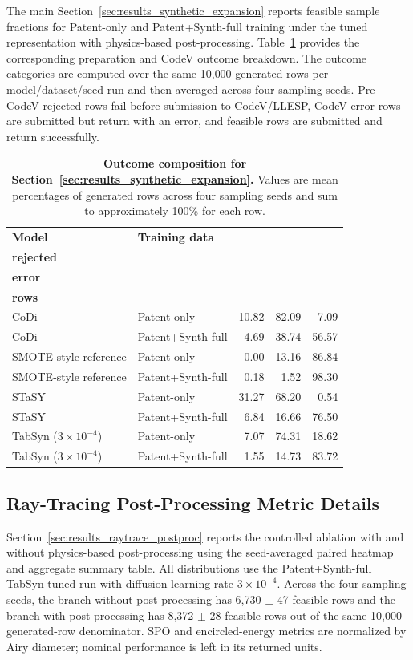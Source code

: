 The main Section~\ref{sec:results_synthetic_expansion} reports feasible sample fractions for Patent-only and Patent+Synth-full training under the tuned representation with physics-based post-processing. Table~\ref{tab:appendix_section_6_1_failure_breakdown} provides the corresponding preparation and CodeV outcome breakdown. The outcome categories are computed over the same 10{,}000 generated rows per model/dataset/seed run and then averaged across four sampling seeds. Pre-CodeV rejected rows fail before submission to CodeV/LLESP, CodeV error rows are submitted but return with an error, and feasible rows are submitted and return successfully.

\begin{table}[htbp]
\centering
\scriptsize
\setlength{\tabcolsep}{4pt}
\caption{\textbf{Outcome composition for Section~\ref{sec:results_synthetic_expansion}.} Values are mean percentages of generated rows across four sampling seeds and sum to approximately 100\% for each row.}
\label{tab:appendix_section_6_1_failure_breakdown}
\begin{tabular}{llrrr}
\toprule
\textbf{Model} & \textbf{Training data} & \shortstack{\textbf{Pre-CodeV}\\\textbf{rejected}} & \shortstack{\textbf{CodeV}\\\textbf{error}} & \shortstack{\textbf{Feasible}\\\textbf{rows}} \\
\midrule
CoDi & Patent-only & 10.82 & 82.09 & 7.09 \\
CoDi & Patent+Synth-full & 4.69 & 38.74 & 56.57 \\
SMOTE-style reference & Patent-only & 0.00 & 13.16 & 86.84 \\
SMOTE-style reference & Patent+Synth-full & 0.18 & 1.52 & 98.30 \\
STaSY & Patent-only & 31.27 & 68.20 & 0.54 \\
STaSY & Patent+Synth-full & 6.84 & 16.66 & 76.50 \\
TabSyn ($3\times10^{-4}$) & Patent-only & 7.07 & 74.31 & 18.62 \\
TabSyn ($3\times10^{-4}$) & Patent+Synth-full & 1.55 & 14.73 & 83.72 \\
\bottomrule
\end{tabular}
\end{table}

\subsection{Ray-Tracing Post-Processing Metric Details}
\label{app:raytrace_metric_delta_details}

Section~\ref{sec:results_raytrace_postproc} reports the controlled ablation with and without physics-based post-processing using the seed-averaged paired heatmap and aggregate summary table. All distributions use the Patent+Synth-full TabSyn tuned run with diffusion learning rate $3\times10^{-4}$. Across the four sampling seeds, the branch without post-processing has 6{,}730 \ensuremath{\pm} 47 feasible rows and the branch with post-processing has 8{,}372 \ensuremath{\pm} 28 feasible rows out of the same 10{,}000 generated-row denominator. SPO and encircled-energy metrics are normalized by Airy diameter; nominal performance is left in its returned units.
